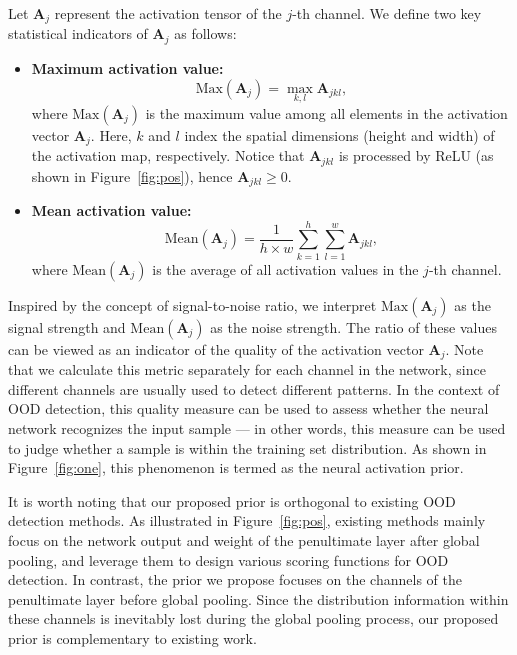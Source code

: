 Let \( \mathbf{A}_j \) represent the activation tensor of the \( j \)-th channel. We define two key statistical indicators of \( \mathbf{A}_j \) as follows:
\begin{itemize}
\item \textbf{Maximum activation value:}
\begin{equation}
\text{Max}(\mathbf{A}_j) = \max_{k,l} \mathbf{A}_{jkl},
\end{equation}
where \( \text{Max}(\mathbf{A}_j) \) is the maximum value among all elements in the activation vector \( \mathbf{A}_j \). Here, \( k \) and \( l \) index the spatial dimensions (height and width) of the activation map, respectively. Notice that $\mathbf{A}_{jkl}$ is processed by ReLU (as shown in Figure~\ref{fig:pos}), hence $\mathbf{A}_{jkl}\geq0$.
\item \textbf{Mean activation value:}
\begin{equation}
\text{Mean}(\mathbf{A}_j) = \frac{1}{h \times w} \sum_{k=1}^{h} \sum_{l=1}^{w} \mathbf{A}_{jkl},
\end{equation}
where \( \text{Mean}(\mathbf{A}_j) \) is the average of all activation values in the \( j \)-th channel.

\end{itemize}

Inspired by the concept of signal-to-noise ratio, we interpret \( \text{Max}(\mathbf{A}_j) \) as the signal strength and \( \text{Mean}(\mathbf{A}_j) \) as the noise strength. The ratio of these values can be viewed as an indicator of the quality of the activation vector \( \mathbf{A}_j \). Note that we calculate this metric separately for each channel in the network, since different channels are usually used to detect different patterns. In the context of OOD detection, this quality measure can be used to assess whether the neural network recognizes the input sample --- in other words, this measure can be used to judge whether a sample is within the training set distribution. As shown in Figure~\ref{fig:one}, this phenomenon is termed as the neural activation prior.

It is worth noting that our proposed prior is orthogonal to existing OOD detection methods. As illustrated in Figure~\ref{fig:pos}, existing methods mainly focus on the network output and weight of the penultimate layer after global pooling, and leverage them to design various scoring functions for OOD detection. In contrast, the prior we propose focuses on the channels of the penultimate layer before global pooling. Since the distribution information within these channels is inevitably lost during the global pooling process, our proposed prior is complementary to existing work. 

